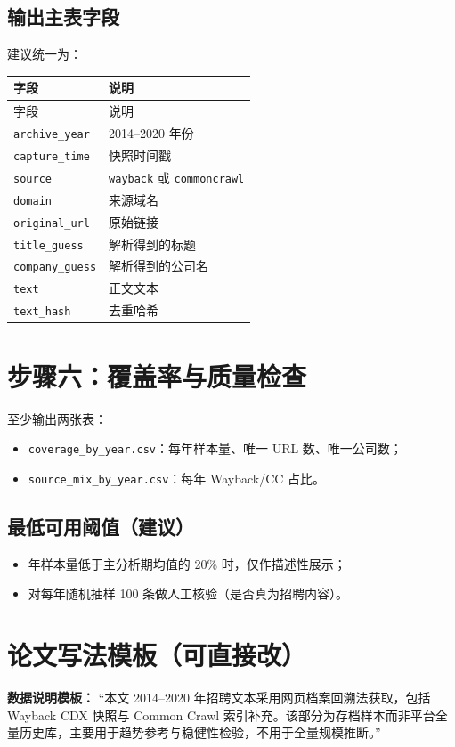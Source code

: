\documentclass[12pt,a4paper]{ctexart}
\begin{document}
\subsection{输出主表字段}
建议统一为：
\begin{longtable}{ll}
\toprule
字段 & 说明 \\
\midrule
\endfirsthead
\toprule
字段 & 说明 \\
\midrule
\endhead
\bottomrule
\endfoot
\texttt{archive\_year} & 2014--2020 年份 \\
\texttt{capture\_time} & 快照时间戳 \\
\texttt{source} & \texttt{wayback} 或 \texttt{commoncrawl} \\
\texttt{domain} & 来源域名 \\
\texttt{original\_url} & 原始链接 \\
\texttt{title\_guess} & 解析得到的标题 \\
\texttt{company\_guess} & 解析得到的公司名 \\
\texttt{text} & 正文文本 \\
\texttt{text\_hash} & 去重哈希 \\
\bottomrule
\end{longtable}

\section{步骤六：覆盖率与质量检查}
至少输出两张表：
\begin{itemize}
    \item \texttt{coverage\_by\_year.csv}：每年样本量、唯一 URL 数、唯一公司数；
    \item \texttt{source\_mix\_by\_year.csv}：每年 Wayback/CC 占比。
\end{itemize}

\subsection{最低可用阈值（建议）}
\begin{itemize}
    \item 年样本量低于主分析期均值的 20\% 时，仅作描述性展示；
    \item 对每年随机抽样 100 条做人工核验（是否真为招聘内容）。
\end{itemize}

\section{论文写法模板（可直接改）}
\textbf{数据说明模板：}
“本文 2014--2020 年招聘文本采用网页档案回溯法获取，包括 Wayback CDX 快照与 Common Crawl 索引补充。该部分为存档样本而非平台全量历史库，主要用于趋势参考与稳健性检验，不用于全量规模推断。”
\end{document}
